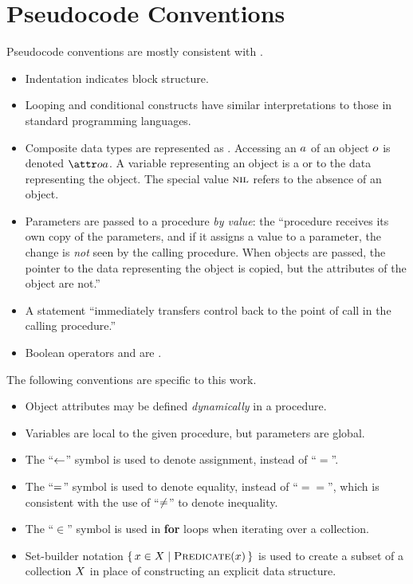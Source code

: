 \chapter{Pseudocode Conventions}\label{ch:pseudocode-conventions}

Pseudocode conventions are mostly consistent with \citet{Cormen2022}.
\begin{itemize}
  \item Indentation indicates block structure.
  \item Looping and conditional constructs have similar interpretations to those in standard programming languages.
  \item Composite data types are represented as . Accessing an  $a$ of an object $o$ is denoted
  $\aSomeObjectAttribute$. A variable representing an object is a  or  to the data representing the object. The special value
  $\textsc{nil}$ refers to the absence of an object.
  \item Parameters are passed to a procedure \emph{by value}: the ``procedure receives its own copy of the parameters, and if it assigns a value to a parameter, the change is \emph{not} seen by the calling procedure. When objects are passed, the pointer to the data representing the object is copied, but the attributes of the object are not.''
  \item A {\Return} statement ``immediately transfers control back to the point of call in the calling procedure.''
  \item Boolean operators {\AND} and {\OR} are .
\end{itemize}
The following conventions are specific to this work.
\begin{itemize}
  \item Object attributes may be defined \emph{dynamically} in a procedure.
  \item Variables are local to the given procedure, but parameters are global.
  \item The ``$\leftarrow$'' symbol is used to denote assignment, instead of ``$=$''.
  \item The ``$=$'' symbol is used to denote equality, instead of ``$==$'', which is consistent with the use of ``$\neq$'' to denote inequality.
  \item The ``$\in$'' symbol is used in \textbf{for} loops when iterating over a collection.
  \item Set-builder notation $\setBuilder{\vSomeElement \in \vSomeSet}{\cPredicate[\vSomeElement]}$ is used to create a subset of a collection $X$ in place of constructing an explicit data structure.
\end{itemize}